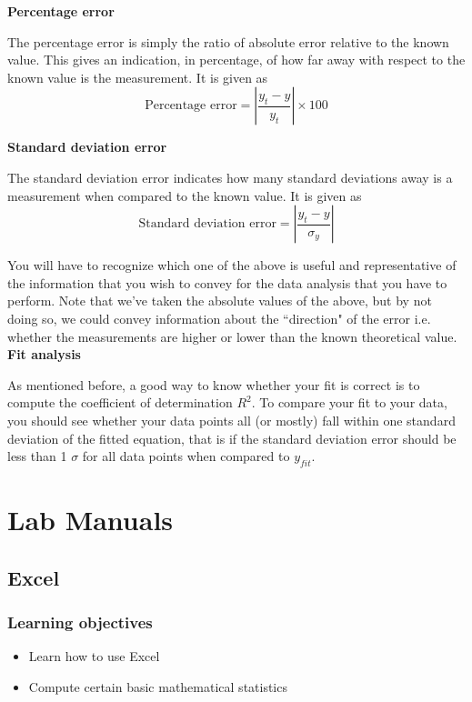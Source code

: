 \documentclass[12pt]{report}
\begin{document}
\noindent \textbf{Percentage error}

The percentage error is simply the ratio of absolute error relative to the known value. This gives an indication, in percentage, of how far away with respect to the known value is the measurement. It is given as
\begin{equation}
\text{Percentage error} = \left\rvert \frac{y_t - y}{y_t} \right\rvert \times 100
\end{equation}

\noindent \textbf{Standard deviation error}

The standard deviation error indicates how many standard deviations away is a measurement when compared to the known value. It is given as
\begin{equation}
\text{Standard deviation error} = \left\rvert \frac{y_t - y}{\sigma_y} \right\rvert
\end{equation}

You will have to recognize which one of the above is useful and representative of the information that you wish to convey for the data analysis that you have to perform. Note that we've taken the absolute values of the above, but by not doing so, we could convey information about the ``direction" of the error i.e. whether the measurements are higher or lower than the known theoretical value.\\

\noindent \large \textbf{Fit analysis} \normalsize

As mentioned before, a good way to know whether your fit is correct is to compute the coefficient of determination $R^2$. To compare your fit to your data, you should see whether your data points all (or mostly) fall within one standard deviation of the fitted equation, that is if the standard deviation error should be less than 1 $\sigma$ for all data points when compared to $y_{fit}$.


{}
\part*{Lab Manuals} \label{Part:Labs}

\chapter{Excel}
\section{Learning objectives}
\begin{itemize}
\item Learn how to use Excel
\item Compute certain basic mathematical statistics
\end{itemize}
\end{document}

